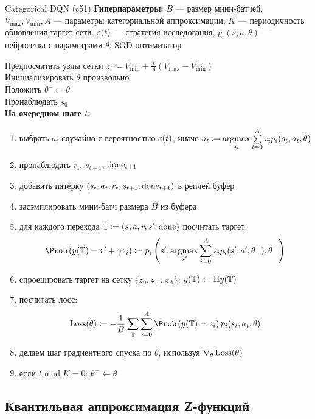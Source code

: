 \begin{algorithm}[label = c51algorithm]{Categorical DQN (c51)}
\textbf{Гиперпараметры:} $B$ --- размер мини-батчей, $V_{\max}, V_{\min}, A$ --- параметры категориальной аппроксимации, $K$ --- периодичность обновления таргет-сети, $\varepsilon(t)$ --- стратегия исследования, $p_i(s, a, \theta)$ --- нейросетка с параметрами $\theta$, SGD-оптимизатор

\vspace{0.3cm}
Предпосчитать узлы сетки $z_i \coloneqq V_{\min} + \frac{i}{A}(V_{\max} - V_{\min})$ \\
Инициализировать $\theta$ произвольно \\
Положить $\theta^- \coloneqq \theta$ \\
Пронаблюдать $s_0$ \\
\textbf{На очередном шаге $t$:}
\begin{enumerate}
    \item выбрать $a_t$ случайно с вероятностью $\varepsilon(t)$, иначе $a_t \coloneqq \mathop{\mathrm{argmax}}\limits_{a_t} \sum\limits_{i=0}^A z_i p_i(s_t, a_t, \theta)$
    \item пронаблюдать $r_t$,  $s_{t+1}$, $\mathrm{done}_{t+1}$
    \item добавить пятёрку $(s_t, a_t, r_t, s_{t+1}, \mathrm{done}_{t+1})$ в реплей буфер
    \item засэмплировать мини-батч размера $B$ из буфера
    \item для каждого перехода $\mathbb{T} \coloneqq (s, a, r, s', \mathrm{done})$ посчитать таргет:
    $$\Prob \left( y(\T) = r' + \gamma z_i \right) \coloneqq p_i\left( s', \argmax_{a'} \sum_{i=0}^A z_i p_i(s', a', \theta^-), \theta^- \right) $$
    \item спроецировать таргет на сетку $\{ z_0, z_1 \dots z_{A} \}$: $y(\mathbb{T}) \leftarrow \Pi y(\mathbb{T})$ 
    \item посчитать лосс:
    $$\Loss(\theta) \coloneqq -\frac{1}{B}\sum_{\T} \sum_{i=0}^{A} \Prob \left( y(\T) = z_i \right) p_i(s_t, a_t, \theta) $$
    \item делаем шаг градиентного спуска по $\theta$, используя $\nabla_\theta \operatorname{Loss}(\theta)$
    \item если $t \operatorname{mod} K = 0$: $\theta^- \gets \theta$
\end{enumerate}
\end{algorithm}

\subsection{Квантильная аппроксимация Z-функций}

